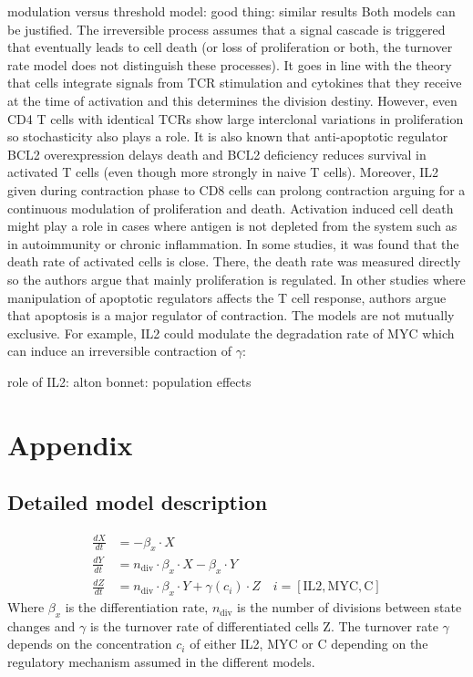 \documentclass[12pt,a4paper]{article}
\begin{document}
modulation versus threshold model:
good thing: similar results
Both models can be justified. The irreversible process assumes that a signal cascade is triggered that eventually leads to cell death (or loss of proliferation or both, the turnover rate model does not distinguish these processes). It goes in line with the theory that cells integrate signals from TCR stimulation and cytokines that they receive at the time of activation and this determines the division destiny. However, even CD4 T cells with identical TCRs show large interclonal variations in proliferation so stochasticity also plays a role. It is also known that anti-apoptotic regulator BCL2 overexpression delays death and BCL2 deficiency reduces survival in activated T cells (even though more strongly in naive T cells). Moreover, IL2 given during contraction phase to CD8 cells can prolong contraction arguing for a continuous modulation of proliferation and death. Activation induced cell death might play a role in cases where antigen is not depleted from the system such as in autoimmunity or chronic inflammation. In some studies, it was found that the death rate of activated cells is close. There, the death rate was measured directly so the authors argue that mainly proliferation is regulated. In other studies where manipulation of apoptotic regulators affects the T cell response, authors argue that apoptosis is a major regulator of contraction. The models are not mutually exclusive. For example, IL2 could modulate the degradation rate of MYC which can induce an irreversible contraction of $\gamma$:

role of IL2: alton bonnet: population effects

\section*{Appendix}
\subsection*{Detailed model description}
\begin{align*}
\frac{dX}{dt} &= -\beta_x \cdot X\\
\frac{dY}{dt} &= n_{\text{div}} \cdot \beta_x \cdot X - \beta_x \cdot Y \\
\frac{dZ}{dt} &= n_{\text{div}} \cdot \beta_x \cdot Y + \gamma(c_i) \cdot Z \quad i = [\text{IL2}, \text{MYC}, \text{C}]
\end{align*}
Where $\beta_x$ is the differentiation rate, $n_\text{div}$ is the number of divisions between state changes and $\gamma$ is the turnover rate of differentiated cells Z. The turnover rate $\gamma$ depends on the concentration $c_i$ of either IL2, MYC or C depending on the regulatory mechanism assumed in the different models.
\end{document}
